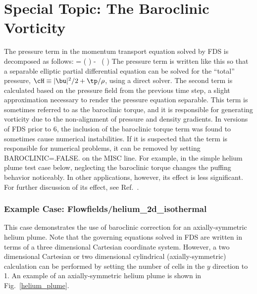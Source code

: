 \documentclass[11pt]{book}
\begin{document}
\section{Special Topic: The Baroclinic Vorticity}
\label{baroclinic_torque}

The pressure term in the momentum transport equation solved by FDS is decomposed as follows:
\be
    \nabla \tp = \nabla \left( \frac{\tp}{\rho}\right) - \tp \, \nabla \left( \right)
\ee
The pressure term is written like this so that a separable elliptic partial differential equation can be solved for the ``total'' pressure, $\cH \equiv |\bu|^2/2 + \tp/\rho$, using a direct solver. The second term is calculated based on the pressure field from the previous time step, a slight approximation necessary to render the pressure equation separable. This term is sometimes referred to as the baroclinic torque, and it is responsible for generating vorticity due to the non-alignment of pressure and density gradients. In versions of FDS prior to 6, the inclusion of the baroclinic torque term was found to sometimes cause numerical instabilities. If it is suspected that the term is responsible for numerical problems, it can be removed by setting {\ct BAROCLINIC=.FALSE.} on the {\ct MISC} line. For example, in the simple helium plume test case below, neglecting the baroclinic torque changes the puffing behavior noticeably. In other applications, however, its effect is less significant. For further discussion of its effect, see Ref.~\cite{Xin:JSS2005}.



\subsubsection{Example Case: Flowfields/helium\_2d\_isothermal}
\label{helium_2d_isothermal}

This case demonstrates the use of baroclinic correction for an axially-symmetric helium plume. Note that the governing equations solved in FDS are written in terms of a three dimensional Cartesian coordinate system. However, a two dimensional Cartesian or two dimensional cylindrical (axially-symmetric) calculation can be performed by setting the number of cells in the $y$ direction to 1. An example of an axially-symmetric helium plume is shown in Fig.~\ref{helium_plume}.
\end{document}
